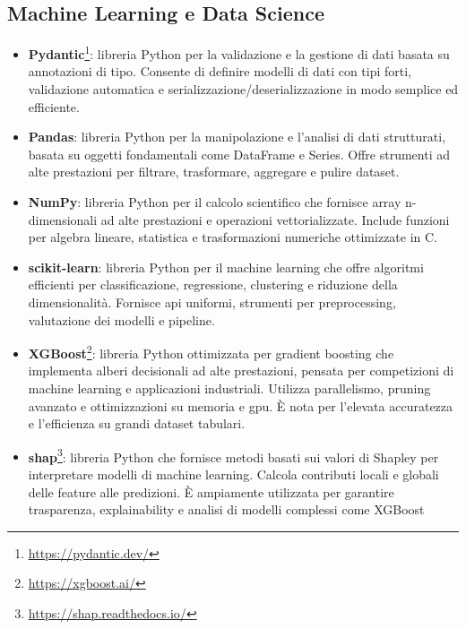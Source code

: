 \subsection{Machine Learning e Data Science}
\begin{itemize}
    \item \textbf{Pydantic}\footnote{\url{https://pydantic.dev/}}: libreria Python per la validazione e la gestione di dati basata su annotazioni di tipo. Consente di definire modelli di dati con tipi forti, validazione automatica e serializzazione/deserializzazione in modo semplice ed efficiente.
    \item \textbf{Pandas}: libreria Python per la manipolazione e l’analisi di dati strutturati, basata su oggetti fondamentali come DataFrame e Series. Offre strumenti ad alte prestazioni per filtrare, trasformare, aggregare e pulire dataset.
    \item \textbf{NumPy}: libreria Python per il calcolo scientifico che fornisce array n-dimensionali ad alte prestazioni e operazioni vettorializzate. Include funzioni per algebra lineare, statistica e trasformazioni numeriche ottimizzate in C.
    \item \textbf{scikit-learn}: libreria Python per il machine learning che offre algoritmi efficienti per classificazione, regressione, clustering e riduzione della dimensionalità. Fornisce \acrshort{api} uniformi, strumenti per preprocessing, valutazione dei modelli e pipeline.
    \item \textbf{XGBoost}\footnote{\url{https://xgboost.ai/}}: libreria Python ottimizzata per gradient boosting che implementa alberi decisionali ad alte prestazioni, pensata per competizioni di machine learning e applicazioni industriali. Utilizza parallelismo, pruning avanzato e ottimizzazioni su memoria e \acrshort{gpu}. È nota per l’elevata accuratezza e l’efficienza su grandi dataset tabulari.
    \item \textbf{\acrshort{shap}}\footnote{\url{https://shap.readthedocs.io/}}: libreria Python che fornisce metodi basati sui valori di Shapley per interpretare modelli di machine learning. Calcola contributi locali e globali delle feature alle predizioni. È ampiamente utilizzata per garantire trasparenza, explainability e analisi di modelli complessi come XGBoost
\end{itemize}

